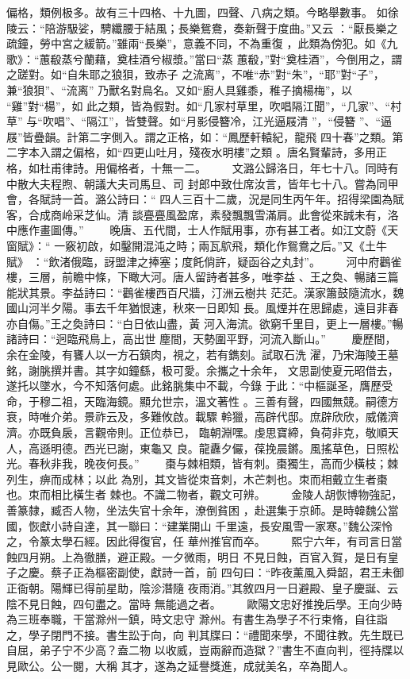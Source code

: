\documentclass{ctexart}
\begin{document}
偏格，類例极多。故有三十四格、十九圖，四聲、八病之類。今略舉數事。 如徐陵云：``陪游馺娑，騁纖腰于結風；長樂鴛鴦，奏新聲于度曲。''又云 ：``厭長樂之疏鐘，勞中宮之緩箭。''雖兩``長樂''，意義不同，不為重復 ，此類為傍犯。如《九歌》：``蕙殽蒸兮蘭藉，奠桂酒兮椒漿。''當曰``蒸 蕙殽，''對``奠桂酒''，今倒用之，謂之蹉對。如``自朱耶之狼狽，致赤子 之流离''，不唯``赤''對``朱''，``耶''對``子''，兼``狼狽''、``流离'' 乃獸名對鳥名。又如``廚人具雞黍，稚子摘楊梅''，以 ``雞''對``楊''，如 此之類，皆為假對。如``几家村草里，吹唱隔江聞''，``几家''、``村草'' 与``吹唱''、``隔江''，皆雙聲。如``月影侵簪冷，江光逼屐清 ''，``侵簪 ''、``逼屐''皆疊韻。計第二字側入。謂之正格，如：``鳳歷軒轅紀，龍飛 四十春''之類。第二字本入謂之偏格，如``四更山吐月，殘夜水明樓''之類 。唐名賢輩詩，多用正格，如杜甫律詩。用偏格者，十無一二。 　　文潞公歸洛日，年七十八。同時有中散大夫程煦、朝議大夫司馬旦、司 封郎中致仕席汝言，皆年七十八。嘗為同甲會，各賦詩一首。潞公詩曰：`` 四人三百十二歲，況是同生丙午年。招得梁園為賦客，合成商岭采芝仙。清 談亹亹風盈席，素發飄飄雪滿肩。此會從來誠未有，洛中應作畫圖傳。'' 　　晚唐、五代間，士人作賦用事，亦有甚工者。如江文蔚《天窗賦》：`` 一竅初啟，如鑿開混沌之時；兩瓦鴥飛，類化作鴛鴦之后。''又《土牛賦》 ：``飲渚俄臨，訝盟津之捧塞；度飥倘許，疑函谷之丸封''。 　　河中府鸛雀樓，三層，前瞻中條，下瞰大河。唐人留詩者甚多，唯李益 、王之奐、暢諸三篇能狀其景。李益詩曰：``鸛雀樓西百尺牆，汀洲云樹共 茫茫。漢家簫鼓隨流水，魏國山河半夕陽。事去千年猶恨速，秋來一日即知 長。風煙并在思歸處，遠目非春亦自傷。''王之奐詩曰：``白日依山盡，黃 河入海流。欲窮千里目，更上一層樓。''暢諸詩曰：``迥臨飛鳥上，高出世 塵間，天勢圍平野，河流入斷山。'' 　　慶歷間，余在金陵，有饔人以一方石鎮肉，視之，若有鐫刻。試取石洗 濯，乃宋海陵王墓銘，謝朓撰并書。其字如鐘繇，极可愛。余攜之十余年， 文思副使夏元昭借去，遂托以墜水，今不知落何處。此銘朓集中不載，今錄 于此：``中樞誕圣，膺歷受命，于穆二祖，天臨海鏡。顯允世宗，溫文著性 。三善有聲，四國無競。嗣德方衰，時唯介弟。景祚云及，多難攸啟。載驟 軨獵，高辟代邸。庶辟欣欣，威儀濟濟。亦既負扆，言觀帝則。正位恭已， 臨朝淵嘿。虔思寶締，負荷非克，敬順天人，高遜明德。西光已謝，東龜又 良。龍纛夕儼，葆挽晨鏘。風搖草色，日照松光。春秋非我，晚夜何長。'' 　　棗与棘相類，皆有刺。棗獨生，高而少橫枝；棘列生，痹而成林；以此 為別，其文皆從朿音刺，木芒刺也。朿而相戴立生者棗也。朿而相比橫生者 棘也。不識二物者，觀文可辨。 　　金陵人胡恢博物強記，善篆隸，臧否人物，坐法失官十余年，潦倒貧困 ，赴選集于京師。是時韓魏公當國，恢獻小詩自達，其一聯曰：``建業開山 千里遠，長安風雪一家寒。''魏公深怜之，令篆太學石經。因此得復官，任 華州推官而卒。 　　熙宁六年，有司言日當蝕四月朔。上為徹膳，避正殿。一夕微雨，明日 不見日蝕，百官入賀，是日有皇子之慶。蔡子正為樞密副使，獻詩一首，前 四句曰：``昨夜薰風入舜韶，君王未御正衙朝。陽輝已得前星助，陰沴潛隨 夜雨消。''其敘四月一日避殿、皇子慶誕、云陰不見日蝕，四句盡之。當時 無能過之者。 　　歐陽文忠好推挽后學。王向少時為三班奉職，干當滁州一鎮，時文忠守 滁州。有書生為學子不行束脩，自往詣之，學子閉門不接。書生訟于向，向 判其牒曰：``禮聞來學，不聞往教。先生既已自屈，弟子宁不少高？盍二物 以收威，豈兩辭而造獄？''書生不直向判，徑持牒以見歐公。公一閱，大稱 其才，遂為之延譽獎進，成就美名，卒為聞人。
\clearpage
\end{document}
